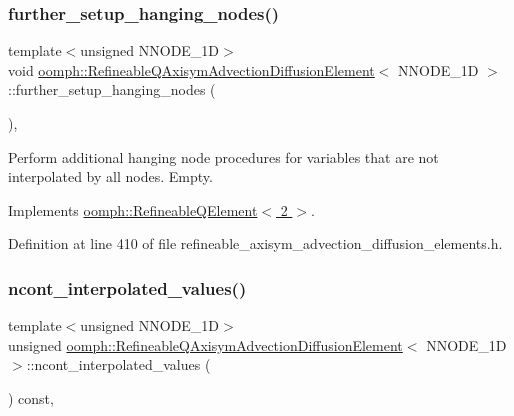 \subsubsection{\texorpdfstring{further\+\_\+setup\+\_\+hanging\+\_\+nodes()}{further\_setup\_hanging\_nodes()}}
{\footnotesize\ttfamily template$<$unsigned N\+N\+O\+D\+E\+\_\+1D$>$ \\
void \hyperlink{classoomph_1_1RefineableQAxisymAdvectionDiffusionElement}{oomph\+::\+Refineable\+Q\+Axisym\+Advection\+Diffusion\+Element}$<$ N\+N\+O\+D\+E\+\_\+1D $>$\+::further\+\_\+setup\+\_\+hanging\+\_\+nodes (\begin{DoxyParamCaption}{ }\end{DoxyParamCaption})\hspace{0.3cm}{\ttfamily [inline]}, {\ttfamily [virtual]}}



Perform additional hanging node procedures for variables that are not interpolated by all nodes. Empty. 



Implements \hyperlink{classoomph_1_1RefineableQElement_3_012_01_4_a01e1eb063dd2c98ebb42d87959ca6b88}{oomph\+::\+Refineable\+Q\+Element$<$ 2 $>$}.



Definition at line 410 of file refineable\+\_\+axisym\+\_\+advection\+\_\+diffusion\+\_\+elements.\+h.

\mbox{\label{classoomph_1_1RefineableQAxisymAdvectionDiffusionElement_a6882fc29a65017f8971fcc1785556aad}} 
\subsubsection{\texorpdfstring{ncont\+\_\+interpolated\+\_\+values()}{ncont\_interpolated\_values()}}
{\footnotesize\ttfamily template$<$unsigned N\+N\+O\+D\+E\+\_\+1D$>$ \\
unsigned \hyperlink{classoomph_1_1RefineableQAxisymAdvectionDiffusionElement}{oomph\+::\+Refineable\+Q\+Axisym\+Advection\+Diffusion\+Element}$<$ N\+N\+O\+D\+E\+\_\+1D $>$\+::ncont\+\_\+interpolated\+\_\+values (\begin{DoxyParamCaption}{ }\end{DoxyParamCaption}) const\hspace{0.3cm}{\ttfamily [inline]}, {\ttfamily [virtual]}}



